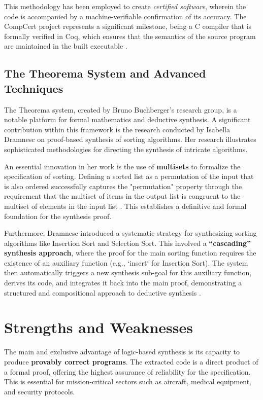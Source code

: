 \documentclass[12pt, a4paper]{report}
\begin{document}
 This methodology has been employed to create \textit{certified software}, wherein the code is accompanied by a machine-verifiable confirmation of its accuracy.  The CompCert project represents a significant milestone, being a C compiler that is formally verified in Coq, which ensures that the semantics of the source program are maintained in the built executable \citep{leroy2009formal}.

\subsection{The Theorema System and Advanced Techniques}
The Theorema system, created by Bruno Buchberger's research group, is a notable platform for formal mathematics and deductive synthesis.  A significant contribution within this framework is the research conducted by Isabella Dramnesc on proof-based synthesis of sorting algorithms.  Her research illustrates sophisticated methodologies for directing the synthesis of intricate algorithms.

An essential innovation in her work is the use of \textbf{multisets} to formalize the specification of sorting.  Defining a sorted list as a permutation of the input that is also ordered successfully captures the "permutation" property through the requirement that the multiset of items in the output list is congruent to the multiset of elements in the input list \citep{dramnesc2006synthesis}.  This establishes a definitive and formal foundation for the synthesis proof.

Furthermore, Dramnesc introduced a systematic strategy for synthesizing sorting algorithms like Insertion Sort and Selection Sort. This involved a \textbf{``cascading'' synthesis approach}, where the proof for the main sorting function requires the existence of an auxiliary function (e.g., `insert` for Insertion Sort). The system then automatically triggers a new synthesis sub-goal for this auxiliary function, derives its code, and integrates it back into the main proof, demonstrating a structured and compositional approach to deductive synthesis \citep{dramnesc2005proof}.

\section{Strengths and Weaknesses}

The main and exclusive advantage of logic-based synthesis is its capacity to produce \textbf{provably correct programs}.  The extracted code is a direct product of a formal proof, offering the highest assurance of reliability for the specification.  This is essential for mission-critical sectors such as aircraft, medical equipment, and security protocols.
\end{document}
